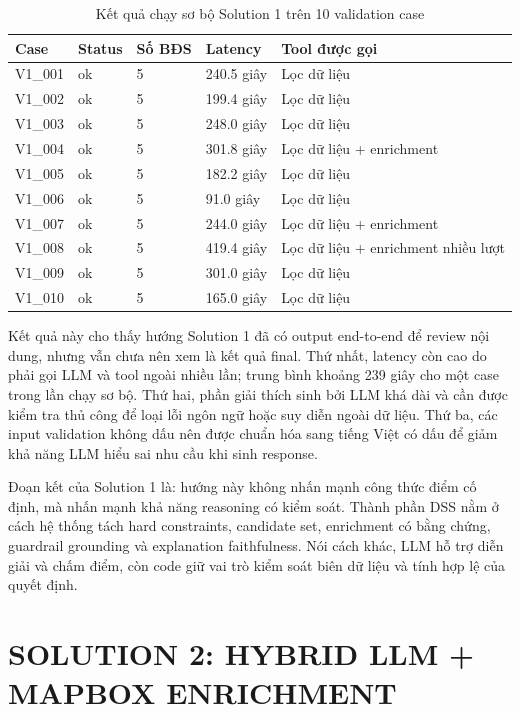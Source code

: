 \documentclass[a4paper,12pt]{article}
\begin{document}
\begin{table}[H]
\centering
\caption{Kết quả chạy sơ bộ Solution 1 trên 10 validation case}
\label{tab:solution1_preliminary}
\small
\begin{tabularx}{\textwidth}{|P{2.0cm}|P{2.0cm}|P{2.2cm}|P{2.5cm}|Y|}
\hline
\textbf{Case} & \textbf{Status} & \textbf{Số BĐS} & \textbf{Latency} & \textbf{Tool được gọi} \\ \hline
V1\_001 & ok & 5 & 240.5 giây & Lọc dữ liệu \\ \hline
V1\_002 & ok & 5 & 199.4 giây & Lọc dữ liệu \\ \hline
V1\_003 & ok & 5 & 248.0 giây & Lọc dữ liệu \\ \hline
V1\_004 & ok & 5 & 301.8 giây & Lọc dữ liệu + enrichment \\ \hline
V1\_005 & ok & 5 & 182.2 giây & Lọc dữ liệu \\ \hline
V1\_006 & ok & 5 & 91.0 giây & Lọc dữ liệu \\ \hline
V1\_007 & ok & 5 & 244.0 giây & Lọc dữ liệu + enrichment \\ \hline
V1\_008 & ok & 5 & 419.4 giây & Lọc dữ liệu + enrichment nhiều lượt \\ \hline
V1\_009 & ok & 5 & 301.0 giây & Lọc dữ liệu \\ \hline
V1\_010 & ok & 5 & 165.0 giây & Lọc dữ liệu \\ \hline
\end{tabularx}
\end{table}

Kết quả này cho thấy hướng Solution 1 đã có output end-to-end để review nội dung, nhưng vẫn chưa nên xem là kết quả final. Thứ nhất, latency còn cao do phải gọi LLM và tool ngoài nhiều lần; trung bình khoảng 239 giây cho một case trong lần chạy sơ bộ. Thứ hai, phần giải thích sinh bởi LLM khá dài và cần được kiểm tra thủ công để loại lỗi ngôn ngữ hoặc suy diễn ngoài dữ liệu. Thứ ba, các input validation không dấu nên được chuẩn hóa sang tiếng Việt có dấu để giảm khả năng LLM hiểu sai nhu cầu khi sinh response.

Đoạn kết của Solution 1 là: hướng này không nhấn mạnh công thức điểm cố định, mà nhấn mạnh khả năng reasoning có kiểm soát. Thành phần DSS nằm ở cách hệ thống tách hard constraints, candidate set, enrichment có bằng chứng, guardrail grounding và explanation faithfulness. Nói cách khác, LLM hỗ trợ diễn giải và chấm điểm, còn code giữ vai trò kiểm soát biên dữ liệu và tính hợp lệ của quyết định.

\section{SOLUTION 2: HYBRID LLM + MAPBOX ENRICHMENT}
\end{document}

